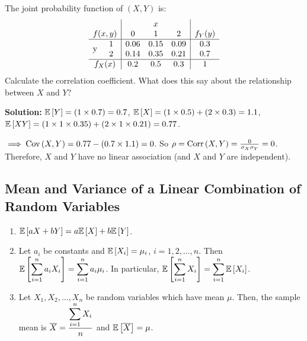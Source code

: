 \begin{example}
    The joint probability function of $(X,Y)$ is:
    \[
        \begin{array}{cc|ccc|c}
            & & \multicolumn{3}{c|}{x} & \\
            \multicolumn{2}{c|}{f(x,y)} & 0 & 1 & 2 & f_Y(y) \\
            \hline
            \multirow{2}{*}{y} 
              & 1 & 0.06 & 0.15 & 0.09 & 0.3 \\
              & 2 & 0.14 & 0.35 & 0.21 & 0.7 \\
            \hline
            \multicolumn{2}{c|}{f_X(x)} & 0.2 & 0.5 & 0.3 & 1
        \end{array}
    \]
    Calculate the correlation coefficient. What does this say about the relationship between $X$ and $Y$?

    \textbf{Solution:} $\mathbb{E}\left[{Y}\right] = (1 \times 0.7) = 0.7$, $\mathbb{E}\left[{X}\right] = (1 \times 0.5) + (2 \times 0.3) = 1.1$, $\mathbb{E}\left[{XY}\right] = (1 \times 1 \times 0.35) + (2 \times 1 \times 0.21) = 0.77$. 

    $\implies \operatorname{Cov}\left({X,Y}\right) = 0.77 - (0.7 \times 1.1) = 0$. So $\rho = \operatorname{Corr}\left({X,Y}\right) = \frac{0}{\sigma_X \sigma_Y} = 0$. \\
    Therefore, $X$ and $Y$ have no linear association (and $X$ and $Y$ are independent).
\end{example}

\subsection{Mean and Variance of a Linear Combination of Random Variables}

\begin{theorem}
    \phantom{}
    \begin{enumerate}
        \item $\mathbb{E}\left[{aX+bY}\right] = a\mathbb{E}\left[{X}\right] + b\mathbb{E}\left[{Y}\right]$.
        \item Let $a_i$ be constants and $\mathbb{E}\left[{X_i}\right] = \mu_i$, $i = 1,2,\ldots ,n$. Then $\mathbb{E}\left[{\displaystyle \sum_{i=1}^{n} a_iX_i}\right] = \displaystyle \sum_{i=1}^{n} a_i \mu_i$. In particular, $\mathbb{E}\left[{\displaystyle \sum_{i=1}^{n} X_i}\right]  = \displaystyle \sum_{i=1}^{n} \mathbb{E}\left[{X_i}\right]$. \vspace{1mm}
        \item Let $X_1, X_2,\ldots , X_n$ be random variables which have mean $\mu$. Then, the sample mean is $\overline{X} = \displaystyle \frac{\displaystyle \sum_{i=1}^{n} X_i}{n}$ and $\mathbb{E}\left[{\overline{X}}\right] = \mu$. 
    \end{enumerate}
\end{theorem}

